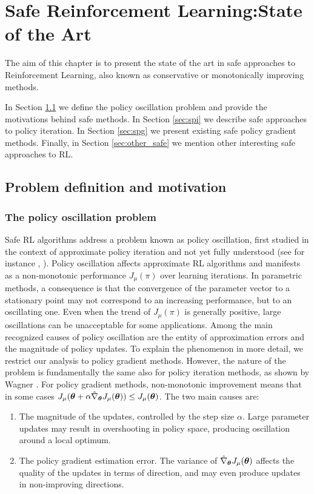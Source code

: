 \chapter{Safe Reinforcement Learning:\newline State of the Art}\label{chap:soa}
The aim of this chapter is to present the state of the art in safe approaches to Reinforcement Learning, also known as conservative or monotonically improving methods. 

In Section \ref{sec:safe_def} we define the policy oscillation problem and provide the motivations behind safe methods. In Section \ref{sec:spi} we describe safe approaches to policy iteration. In Section \ref{sec:spg} we present existing safe policy gradient methods. Finally, in Section \ref{sec:other_safe} we mention other interesting safe approaches to \ac{RL}.

\section{Problem definition and motivation} \label{sec:safe_def}
\subsection{The policy oscillation problem}
Safe \ac{RL} algorithms address a problem known as policy oscillation, first studied in the context of approximate policy iteration and not yet fully understood (see for instance \cite{Bertsekas2011api}, \cite{wagner2011reinterpretation}). Policy oscillation affects approximate \ac{RL} algorithms and manifests as a non-monotonic performance $J_\mu(\pi)$ over learning iterations. In parametric methods, a consequence is that the convergence of the parameter vector to a stationary point may not correspond to an increasing performance, but to an oscillating one. Even when the trend of $J_\mu(\pi)$ is generally positive, large oscillations can be unacceptable for some applications.
Among the main recognized causes of policy oscillation are the entity of approximation errors and the magnitude of policy updates.
To explain the phenomenon in more detail, we restrict our analysis to policy gradient methods. However, the nature of the problem is fundamentally the same also for policy iteration methods, as shown by Wagner \cite{wagner2011reinterpretation}. For policy gradient methods, non-monotonic improvement means that in some cases $J_\mu(\boldsymbol{\theta}+\alpha\hat{\nabla}_{\boldsymbol{\theta}}J_{\mu}(\boldsymbol{\theta})) \leq J_\mu(\boldsymbol{\theta})$. The two main causes are:
\begin{enumerate}
\item The magnitude of the updates, controlled by the step size $\alpha$. Large parameter updates may result in overshooting in policy space, producing oscillation around a local optimum.
\item The policy gradient estimation error. The variance of $\hat{\nabla}_{\boldsymbol{\theta}}J_{\mu}(\boldsymbol{\theta})$ affects the quality of the updates in terms of direction, and may even produce updates in non-improving directions.
\end{enumerate} 


